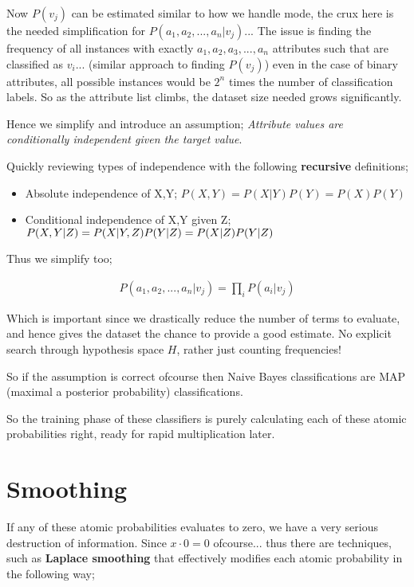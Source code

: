 \documentclass{article}
\begin{document}
Now $P(v_j)$ can be estimated similar to how we handle mode, the crux here is the needed simplification for $P(a_1, a_2, ..., a_n | v_j)$... The issue is finding the frequency of all instances with exactly $a_1,a_2,a_3,...,a_n$ attributes such that are classified as $v_i$... (similar approach to finding $P(v_j)$) even in the case of binary attributes, all possible instances would be $2^n$ times the number of classification labels. So as the attribute list climbs, the dataset size needed grows significantly.
 
Hence we simplify and introduce an assumption; {\em Attribute values are conditionally independent given the target value}.

Quickly reviewing types of independence with the following {\bf recursive} definitions;

\begin{itemize}
	\item Absolute independence of X,Y; $P(X,Y) = P(X|Y)P(Y) = P(X)P(Y)$
	\item Conditional independence of X,Y given Z; $P(X,Y | Z) = \\ P(X|Y, Z)P(Y | Z) = P(X|Z)P(Y|Z)$
\end{itemize}

Thus we simplify too;

\begin{align*}
P(a_1, a_2, ..., a_n | v_j) = \prod_i P(a_i | v_j)
\end{align*}

Which is important since we drastically reduce the number of terms to evaluate, and hence gives the dataset the chance to provide a good estimate. No explicit search through hypothesis space $H$, rather just counting frequencies!

So if the assumption is correct ofcourse then Naive Bayes classifications are MAP (maximal a posterior probability) classifications.

So the training phase of these classifiers is purely calculating each of these atomic probabilities right, ready for rapid multiplication later.

\section*{Smoothing}
If any of these atomic probabilities evaluates to zero, we have a very serious destruction of information. Since $x\cdot0=0$ ofcourse... thus there are techniques, such as {\bf Laplace smoothing} that effectively modifies each atomic probability in the following way; 
\end{document}
